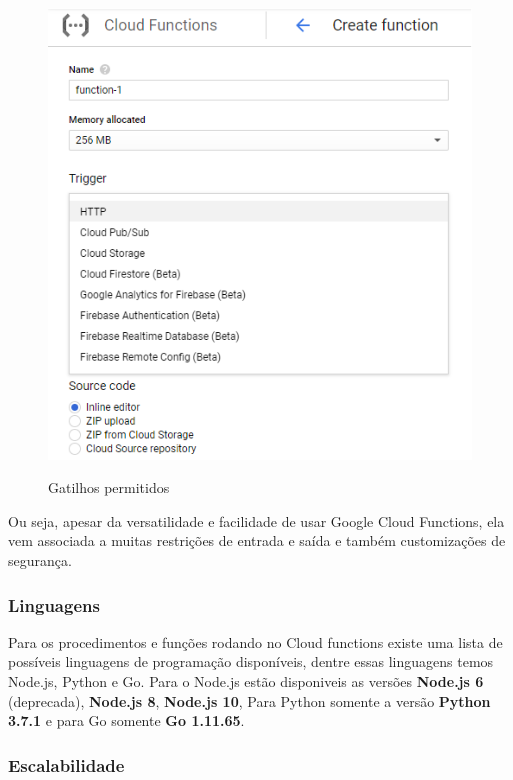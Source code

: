 \begin{figure}[ht]
	\centering
	\caption{Gatilhos permitidos}

	\includegraphics[width=12.5cm]{figuras/google-cloud-functions/triggers.png}
	\label{fig:google-cloud-functions-triggers}
\end{figure}

\bigskip
Ou seja, apesar da versatilidade e facilidade de usar Google Cloud Functions,
ela vem associada a muitas restrições de entrada e saída e também customizações
de segurança.

\subsubsection{Linguagens}

Para os procedimentos e funções rodando no Cloud functions existe uma lista de
possíveis linguagens de programação disponíveis, dentre essas linguagens temos
Node.js, Python e Go.
Para o Node.js estão disponiveis as versões \textbf{Node.js 6} (deprecada),
\textbf{Node.js 8}, \textbf{Node.js 10}, Para Python somente a versão
\textbf{Python 3.7.1} e para Go somente \textbf{Go 1.11.65}.

\subsubsection{Escalabilidade}

